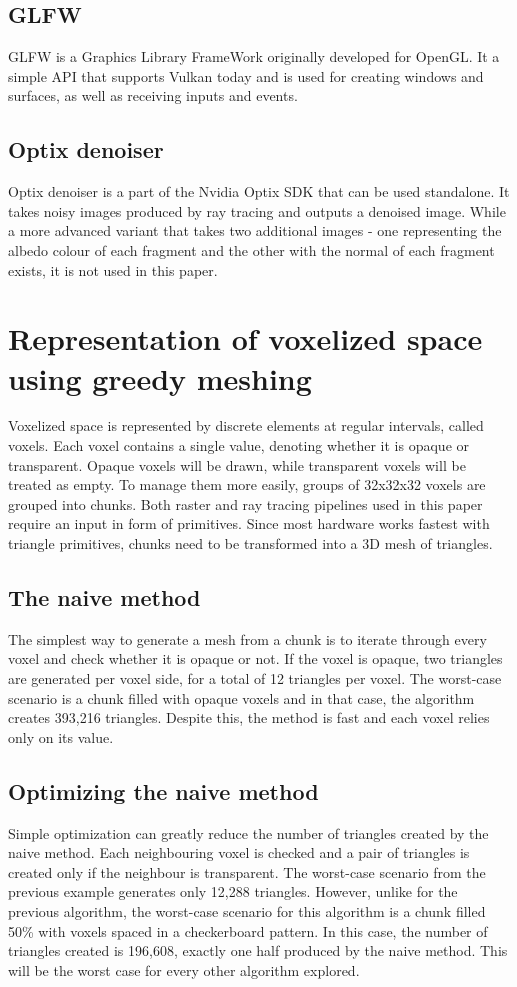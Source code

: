 \documentclass[times, utf8, zavrsni, numeric]{fer}
\begin{document}
\section{GLFW}
GLFW is a Graphics Library FrameWork originally developed for OpenGL. It a simple API that supports Vulkan today and is used for creating windows and surfaces, as well as receiving inputs and events.

\section{Optix denoiser}
Optix denoiser \cite{nvidia_optix} is a part of the Nvidia Optix SDK that can be used standalone. It takes noisy images produced by ray tracing and outputs a denoised image. While a more advanced variant that takes two additional images - one representing the albedo colour of each fragment and the other with the normal of each fragment exists, it is not used in this paper.

\chapter{Representation of voxelized space using greedy meshing}
Voxelized space is represented by discrete elements at regular intervals, called voxels. Each voxel contains a single value, denoting whether it is opaque or transparent. Opaque voxels will be drawn, while transparent voxels will be treated as empty. To manage them more easily, groups of 32x32x32 voxels are grouped into chunks. Both raster and ray tracing pipelines used in this paper require an input in form of primitives. Since most hardware works fastest with triangle primitives, chunks need to be transformed into a 3D mesh of triangles.

\section{The naive method}
The simplest way to generate a mesh from a chunk is to iterate through every voxel and check whether it is opaque or not. If the voxel is opaque, two triangles are generated per voxel side, for a total of 12 triangles per voxel. The worst-case scenario is a chunk filled with opaque voxels and in that case, the algorithm creates 393,216 triangles. Despite this, the method is fast and each voxel relies only on its value.

\section{Optimizing the naive method}
Simple optimization can greatly reduce the number of triangles created by the naive method. Each neighbouring voxel is checked and a pair of triangles is created only if the neighbour is transparent. The worst-case scenario from the previous example generates only 12,288 triangles. However, unlike for the previous algorithm, the worst-case scenario for this algorithm is a chunk filled 50\% with voxels spaced in a checkerboard pattern. In this case, the number of triangles created is 196,608, exactly one half produced by the naive method. This will be the worst case for every other algorithm explored.
\end{document}
